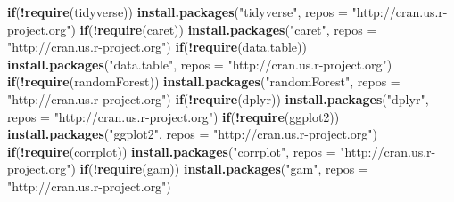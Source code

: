 \documentclass[]{article}
\newenvironment{Shaded}{\begin{snugshade}}{\end{snugshade}}
\newcommand{\ControlFlowTok}[1]{\textcolor[rgb]{0.13,0.29,0.53}{\textbf{#1}}}
\newcommand{\DataTypeTok}[1]{\textcolor[rgb]{0.13,0.29,0.53}{#1}}
\newcommand{\KeywordTok}[1]{\textcolor[rgb]{0.13,0.29,0.53}{\textbf{#1}}}
\newcommand{\NormalTok}[1]{#1}
\newcommand{\OperatorTok}[1]{\textcolor[rgb]{0.81,0.36,0.00}{\textbf{#1}}}
\newcommand{\StringTok}[1]{\textcolor[rgb]{0.31,0.60,0.02}{#1}}
\begin{document}
\begin{Shaded}
\begin{Highlighting}[]
\ControlFlowTok{if}\NormalTok{(}\OperatorTok{!}\KeywordTok{require}\NormalTok{(tidyverse)) }\KeywordTok{install.packages}\NormalTok{(}\StringTok{"tidyverse"}\NormalTok{, }\DataTypeTok{repos =} \StringTok{"http://cran.us.r-project.org"}\NormalTok{)}
\ControlFlowTok{if}\NormalTok{(}\OperatorTok{!}\KeywordTok{require}\NormalTok{(caret)) }\KeywordTok{install.packages}\NormalTok{(}\StringTok{"caret"}\NormalTok{, }\DataTypeTok{repos =} \StringTok{"http://cran.us.r-project.org"}\NormalTok{)}
\ControlFlowTok{if}\NormalTok{(}\OperatorTok{!}\KeywordTok{require}\NormalTok{(data.table)) }\KeywordTok{install.packages}\NormalTok{(}\StringTok{"data.table"}\NormalTok{, }\DataTypeTok{repos =} \StringTok{"http://cran.us.r-project.org"}\NormalTok{)}
\ControlFlowTok{if}\NormalTok{(}\OperatorTok{!}\KeywordTok{require}\NormalTok{(randomForest)) }\KeywordTok{install.packages}\NormalTok{(}\StringTok{"randomForest"}\NormalTok{, }\DataTypeTok{repos =} \StringTok{"http://cran.us.r-project.org"}\NormalTok{)}
\ControlFlowTok{if}\NormalTok{(}\OperatorTok{!}\KeywordTok{require}\NormalTok{(dplyr)) }\KeywordTok{install.packages}\NormalTok{(}\StringTok{"dplyr"}\NormalTok{, }\DataTypeTok{repos =} \StringTok{"http://cran.us.r-project.org"}\NormalTok{)}
\ControlFlowTok{if}\NormalTok{(}\OperatorTok{!}\KeywordTok{require}\NormalTok{(ggplot2)) }\KeywordTok{install.packages}\NormalTok{(}\StringTok{"ggplot2"}\NormalTok{, }\DataTypeTok{repos =} \StringTok{"http://cran.us.r-project.org"}\NormalTok{)}
\ControlFlowTok{if}\NormalTok{(}\OperatorTok{!}\KeywordTok{require}\NormalTok{(corrplot)) }\KeywordTok{install.packages}\NormalTok{(}\StringTok{"corrplot"}\NormalTok{, }\DataTypeTok{repos =} \StringTok{"http://cran.us.r-project.org"}\NormalTok{)}
\ControlFlowTok{if}\NormalTok{(}\OperatorTok{!}\KeywordTok{require}\NormalTok{(gam)) }\KeywordTok{install.packages}\NormalTok{(}\StringTok{"gam"}\NormalTok{, }\DataTypeTok{repos =} \StringTok{"http://cran.us.r-project.org"}\NormalTok{)}



\end{Highlighting}
\end{Shaded}
\end{document}
